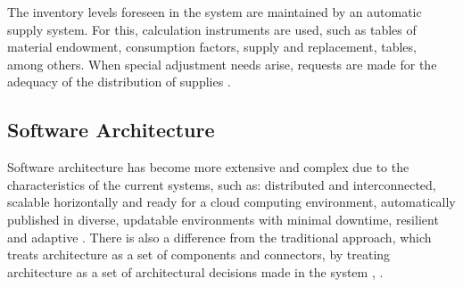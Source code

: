 The inventory levels foreseen in the system are maintained by an automatic supply system. For this, calculation instruments are used, such as tables of material endowment, consumption factors, supply and replacement, tables, among others. When special adjustment needs arise, requests are made for the adequacy of the distribution of supplies \cite{brasil2003}.

\subsection{Software Architecture}


Software architecture has become more extensive and complex due to the characteristics of the current systems, such as: distributed and interconnected, scalable horizontally and ready for a cloud computing environment, automatically published in diverse, updatable environments with minimal downtime, resilient and adaptive \cite{hohpe2016}. There is also a difference from the traditional approach, which treats architecture as a set of components and connectors, by treating architecture as a set of architectural decisions made in the system \cite{bosch2004}, \cite{jansen2005}.


